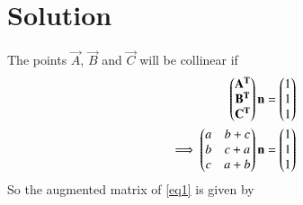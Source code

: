 \documentclass[journal,12pt,twocolumn]{IEEEtran}
\begin{document}
\section{Solution}
The points $\vec{A}$, $\vec{B}$ and $\vec{C}$ will be collinear if
\begin{align}
\begin{pmatrix}\mathbf{A^T}\\\mathbf{B^T}\\\mathbf{C^T}\end{pmatrix}\mathbf{n}=\begin{pmatrix}1\\1\\1\end{pmatrix}\\
\implies\begin{pmatrix}a&b+c\\b&c+a\\c&a+b\end{pmatrix}\mathbf{n}=\begin{pmatrix}1\\1\\1\end{pmatrix}\label{eq1}
\end{align}
So the augmented matrix of \eqref{eq1} is given by
\end{document}
